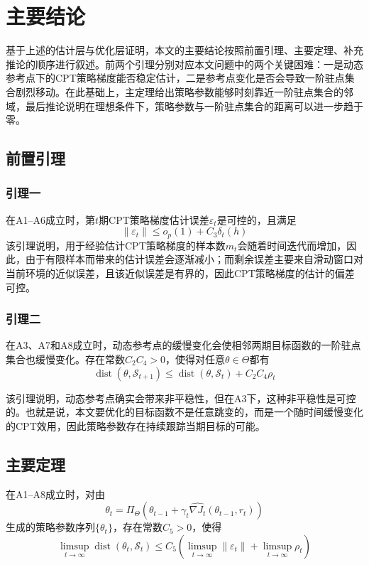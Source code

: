 \section{主要结论}

基于上述的估计层与优化层证明，本文的主要结论按照前置引理、主要定理、补充推论的顺序进行叙述。前两个引理分别对应本文问题中的两个关键困难：一是动态参考点下的CPT策略梯度能否稳定估计，二是参考点变化是否会导致一阶驻点集合剧烈移动。在此基础上，主定理给出策略参数能够时刻靠近一阶驻点集合的邻域，最后推论说明在理想条件下，策略参数与一阶驻点集合的距离可以进一步趋于零。

\subsection{前置引理}

\subsubsection{引理一}
在A1--A6成立时，第$t$期CPT策略梯度估计误差$\varepsilon_t$是可控的，且满足
\begin{equation}
\|\varepsilon_t\|
\le
o_p(1)+C_3\delta_t(h)
\end{equation}
该引理说明，用于经验估计CPT策略梯度的样本数$m_t$会随着时间迭代而增加，因此，由于有限样本而带来的估计误差会逐渐减小；而剩余误差主要来自滑动窗口对当前环境的近似误差，且该近似误差是有界的，因此CPT策略梯度的估计的偏差可控。

\subsubsection{引理二}
在A3、A7和A8成立时，动态参考点的缓慢变化会使相邻两期目标函数的一阶驻点集合也缓慢变化。存在常数$C_2 C_4>0$，使得对任意$\theta \in \Theta$都有
\begin{equation}
\operatorname{dist}(\theta,\mathcal S_{t+1})
\le
\operatorname{dist}(\theta,\mathcal S_t)
+
C_2 C_4 \rho_t
\end{equation}

该引理说明，动态参考点确实会带来非平稳性，但在A3下，这种非平稳性是可控的。也就是说，本文要优化的目标函数不是任意跳变的，而是一个随时间缓慢变化的CPT效用，因此策略参数存在持续跟踪当期目标的可能。

\subsection{主要定理}
在A1--A8成立时，对由
\begin{equation}
\theta_t
=
\Pi_{\Theta}
\left(
\theta_{t-1}
+
\gamma_t
\widehat{\nabla J_t}(\theta_{t-1},r_t)
\right)
\end{equation}
生成的策略参数序列$\{\theta_t\}$，存在常数$C_5>0$，使得
\begin{equation}
\limsup_{t\to\infty}
\operatorname{dist}(\theta_t,\mathcal S_t)
\le
C_5
\left(
\limsup_{t\to\infty}\|\varepsilon_t\|
+
\limsup_{t\to\infty}\rho_t
\right)
\end{equation}

